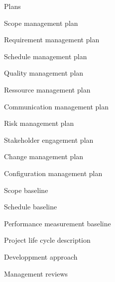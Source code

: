 \documentclass[]{article}
\begin{document}
\begin{section}{Plans}
\begin{subsection}{Scope management plan}

\end{subsection}
\begin{subsection}{Requirement management plan}

\end{subsection}
\begin{subsection}{Schedule management plan}

\end{subsection}
\begin{subsection}{Quality management plan}

\end{subsection}
\begin{subsection}{Ressource management plan}

\end{subsection}
\begin{subsection}{Communication management plan}

\end{subsection}
\begin{subsection}{Risk management plan}

\end{subsection}
\begin{subsection}{Stakeholder engagement plan}

\end{subsection}
\begin{subsection}{Change management plan}

\end{subsection}
\begin{subsection}{Configuration management plan}

\end{subsection}
\begin{subsection}{Scope baseline}

\end{subsection}
\begin{subsection}{Schedule baseline}

\end{subsection}
\begin{subsection}{Performance measurement baseline}

\end{subsection}
\begin{subsection}{Project life cycle description}

\end{subsection}
\begin{subsection}{Developpment approach}

\end{subsection}
\begin{subsection}{Management reviews}

\end{subsection}
\end{section}
\end{document}
